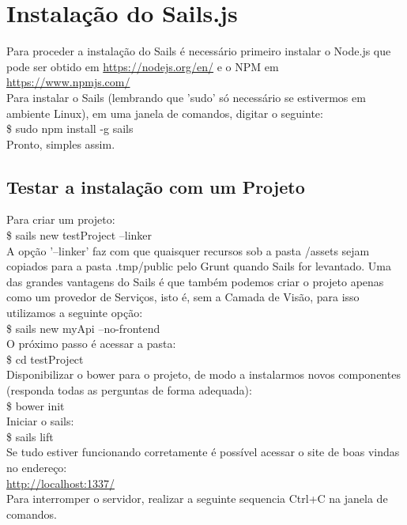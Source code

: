 \documentclass[a4paper,11pt]{article}
\begin{document}
\section{Instalação do Sails.js}
Para proceder a instalação do Sails é necessário primeiro instalar o Node.js
que pode ser obtido em \url{https://nodejs.org/en/} e o NPM  em \url{https://www.npmjs.com/} \\[3mm]
Para instalar o Sails (lembrando que 'sudo' só necessário se estivermos em
ambiente Linux), em uma janela de comandos, digitar o seguinte: \\[1mm]
{\ttfamily\$ sudo npm install -g sails} \\[3mm]
Pronto, simples assim.

\subsection{Testar a instalação com um Projeto}
Para criar um projeto: \\[1mm]
{\ttfamily\$ sails new testProject --linker} \\[3mm]
A opção '--linker' faz com que quaisquer recursos sob a pasta /assets sejam copiados para a pasta .tmp/public pelo Grunt quando Sails for levantado. Uma das grandes vantagens do Sails é que também podemos criar o projeto apenas como um provedor de Serviços, isto é, sem a Camada de Visão, para isso utilizamos a seguinte opção: \\[1mm]
{\ttfamily\$ sails new myApi --no-frontend} \\[3mm]
O próximo passo é acessar a pasta: \\[1mm]
{\ttfamily\$ cd testProject} \\[3mm]
Disponibilizar o bower para o projeto, de modo a instalarmos novos componentes (responda todas as perguntas de forma adequada): \\[1mm]
{\ttfamily\$ bower init} \\[3mm]
Iniciar o sails: \\[1mm]
{\ttfamily\$ sails lift} \\[3mm]
Se tudo estiver funcionando corretamente é possível acessar o site de boas vindas no endereço: \\[1mm]
\url{http://localhost:1337/} \\[3mm]
Para interromper o servidor, realizar a seguinte sequencia {\ttfamily Ctrl+C} na janela de comandos.
\end{document}
